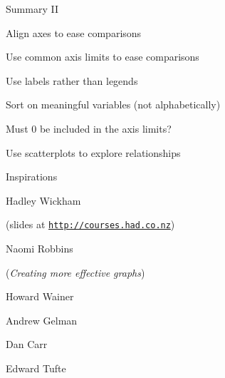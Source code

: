 \documentclass[aspectratio=169,12pt,t]{beamer}
\begin{document}
\begin{frame}{Summary II}

\bbi
\item Align axes to ease comparisons

\item Use common axis limits to ease comparisons

\item Use labels rather than legends

\item Sort on meaningful variables (not alphabetically)

\item Must 0 be included in the axis limits?

\item Use scatterplots to explore relationships
\ei

\note{
}
\end{frame}





\begin{frame}{Inspirations}


\bbi
\item Hadley Wickham
  \bi
  \item[](slides at \href{http://courses.had.co.nz}{\tt http://courses.had.co.nz})
  \ei

\item Naomi Robbins
  \bi
\item[] (\emph{Creating more effective graphs})
\ei

\item Howard Wainer

\item Andrew Gelman

\item Dan Carr

\item Edward Tufte
  \ei


  \note{
  }
\end{frame}
\end{document}
